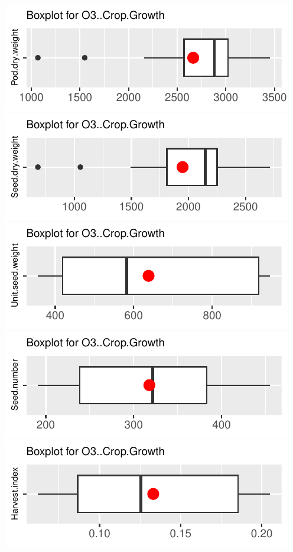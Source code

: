 \documentclass[
]{article}
\begin{document}
\includegraphics{FL_Crop_BMP_QA_single_dataset_files/figure-latex/check-content-of-sheets-38.pdf}
\includegraphics{FL_Crop_BMP_QA_single_dataset_files/figure-latex/check-content-of-sheets-39.pdf}
\includegraphics{FL_Crop_BMP_QA_single_dataset_files/figure-latex/check-content-of-sheets-40.pdf}
\includegraphics{FL_Crop_BMP_QA_single_dataset_files/figure-latex/check-content-of-sheets-41.pdf}
\includegraphics{FL_Crop_BMP_QA_single_dataset_files/figure-latex/check-content-of-sheets-42.pdf}
\end{document}
